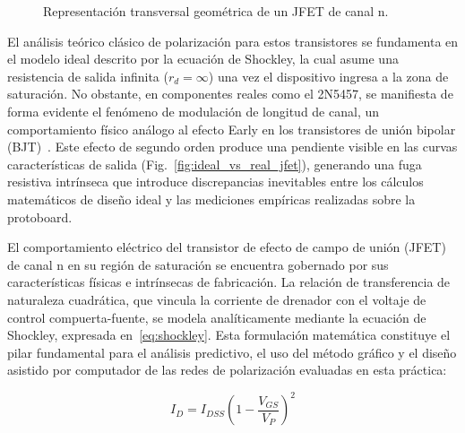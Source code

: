 \documentclass[conference]{IEEEtran}
\begin{document}
\begin{figure}[htbp]
    \caption{Representación transversal geométrica de un JFET de canal n.}\label{fig:estructura_jfet}
\end{figure}

El análisis teórico clásico de polarización para estos transistores se
fundamenta en el modelo ideal descrito por la ecuación de Shockley, la cual
asume una resistencia de salida infinita ($r_d = \infty$) una vez el
dispositivo ingresa a la zona de saturación. No obstante, en componentes reales
como el 2N5457, se manifiesta de forma evidente el fenómeno de modulación de
longitud de canal, un comportamiento físico análogo al efecto Early en los
transistores de unión bipolar (BJT)~\cite{neamen_fisica_semiconductores}. Este
efecto de segundo orden produce una pendiente visible en las curvas
características de salida (Fig.~\ref{fig:ideal_vs_real_jfet}), generando una
fuga resistiva intrínseca que introduce discrepancias inevitables entre los
cálculos matemáticos de diseño ideal y las mediciones empíricas realizadas
sobre la protoboard.

El comportamiento eléctrico del transistor de efecto de campo de unión (JFET)
de canal n en su región de saturación se encuentra gobernado por sus
características físicas e intrínsecas de fabricación. La relación de
transferencia de naturaleza cuadrática, que vincula la corriente de drenador
con el voltaje de control compuerta-fuente, se modela analíticamente mediante
la ecuación de Shockley, expresada en~\eqref{eq:shockley}. Esta formulación
matemática constituye el pilar fundamental para el análisis predictivo, el uso
del método gráfico y el diseño asistido por computador de las redes de
polarización evaluadas en esta práctica:

\begin{equation}
    \label{eq:shockley}
    I_{D}=I_{DSS}{\left(1-\frac{V_{GS}}{V_{P}}\right)}^{2}
\end{equation}
\end{document}

